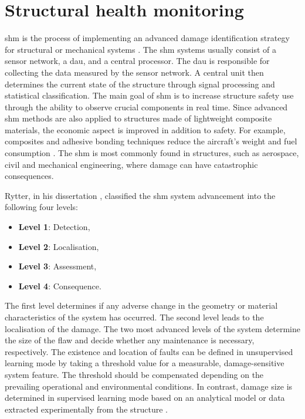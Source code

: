 \section{Structural health monitoring}
\label{sec:scm}

\Ac{shm} is the process of implementing an advanced damage identification strategy for structural or mechanical systems \cite{farrar2007introduction}.
The \ac{shm} systems usually consist of a sensor network, a \ac{dau}, and a central processor.
The \ac{dau} is responsible for collecting the data measured by the sensor network.
A central unit then determines the current state of the structure through signal processing and statistical classification.
The main goal of \ac{shm} is to increase structure safety use through the ability to observe crucial components in real time.
Since advanced \ac{shm} methods are also applied to structures made of lightweight composite materials, the economic aspect is improved in addition to safety.
For example, composites and adhesive bonding techniques reduce the aircraft's weight and fuel consumption \cite{scelsi2011potential}.
The \ac{shm} is most commonly found in structures, such as aerospace, civil and mechanical engineering, where damage can have catastrophic consequences.

Rytter, in his dissertation \cite{rytter1993vibrational}, classified the \ac{shm} system advancement into the following four levels:
\begin{itemize}
	\item[] \textbf{Level 1}: Detection,
	\item[] \textbf{Level 2}: Localisation,
	\item[] \textbf{Level 3}: Assessment,
	\item[] \textbf{Level 4}: Consequence.
\end{itemize}
The first level determines if any adverse change in the geometry or material characteristics of the system has occurred.
The second level leads to the localisation of the damage.
The two most advanced levels of the system determine the size of the flaw and decide whether any maintenance is necessary, respectively.
The existence and location of faults can be defined in unsupervised learning mode by taking a threshold value for a measurable, damage-sensitive system feature. The threshold should be compensated depending on the prevailing operational and environmental conditions.
In contrast, damage size is determined in supervised learning mode based on an analytical model or data extracted experimentally from the structure \cite{worden2007fundamental, hou2018structural}.